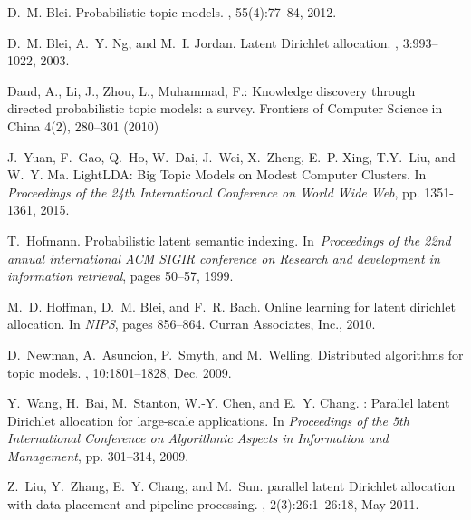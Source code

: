 \documentclass[russian,english]{llncs}
\begin{document}
\begin{thebibliography}{10}

D.~M. Blei.
\newblock Probabilistic topic models.
, 55(4):77--84, 2012.

D.~M. Blei, A.~Y. Ng, and M.~I. Jordan.
\newblock Latent {Dirichlet} allocation.
, 3:993--1022, 2003.

Daud, A., Li, J., Zhou, L., Muhammad, F.: Knowledge discovery through directed
probabilistic topic models: a survey. Frontiers of Computer Science in China
4(2),  280--301 (2010)


J.~Yuan, F.~Gao, Q.~Ho, W.~Dai, J.~Wei, X.~Zheng, E.~P. Xing, T.Y.~Liu, and W.~Y. Ma.
\newblock LightLDA: Big Topic Models on Modest Computer Clusters.
\newblock In {\em Proceedings of the 24th International Conference on World Wide Web}, pp. 1351-1361, 2015.

T.~Hofmann.
\newblock Probabilistic latent semantic indexing.
\newblock In~{\em Proceedings of the 22nd annual international ACM SIGIR
	conference on Research and development in information retrieval},
pages 50--57, 1999.

M.~D. Hoffman, D.~M. Blei, and F.~R. Bach.
\newblock Online learning for latent dirichlet allocation.
\newblock In {\em NIPS}, pages 856--864. Curran Associates, Inc., 2010.

D.~Newman, A.~Asuncion, P.~Smyth, and M.~Welling.
\newblock Distributed algorithms for topic models.
, 10:1801--1828, Dec. 2009.

Y.~Wang, H.~Bai, M.~Stanton, W.-Y. Chen, and E.~Y. Chang.
: Parallel latent {D}irichlet allocation for large-scale applications.
\newblock In {\em Proceedings of the 5th International Conference on
	Algorithmic Aspects in Information and Management}, pp. 301--314, 2009.

Z.~Liu, Y.~Zhang, E.~Y. Chang, and M.~Sun.
 parallel latent {D}irichlet allocation with data placement and pipeline processing.
, 2(3):26:1--26:18, May 2011.


\end{thebibliography}
\end{document}
